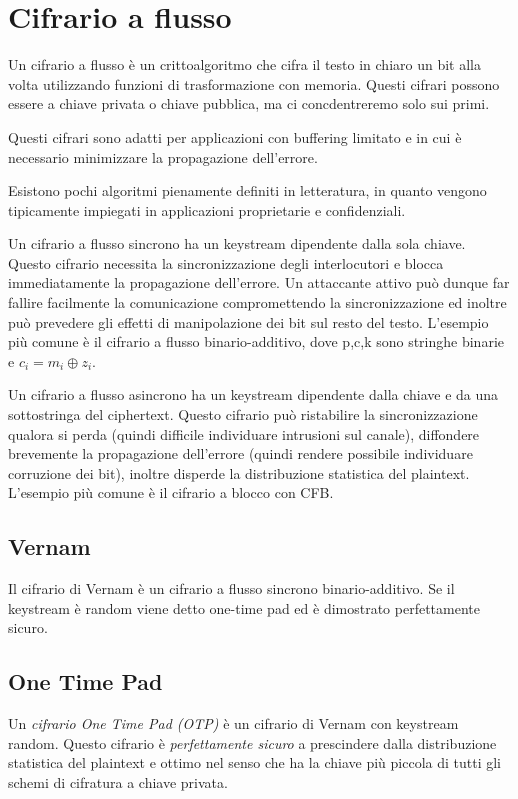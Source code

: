 \chapter{Cifrario a flusso}
\label{chp:stream-ciphers}

Un cifrario a flusso è un crittoalgoritmo che cifra il testo in chiaro un bit alla volta utilizzando funzioni di trasformazione con memoria.
Questi cifrari possono essere a chiave privata o chiave pubblica, ma ci concdentreremo solo sui primi.

Questi cifrari sono adatti per applicazioni con buffering limitato e in cui è necessario minimizzare la propagazione dell'errore.

Esistono pochi algoritmi pienamente definiti in letteratura, in quanto vengono tipicamente impiegati in applicazioni proprietarie e confidenziali.

Un cifrario a flusso sincrono ha un keystream dipendente dalla sola chiave. Questo cifrario necessita la sincronizzazione degli interlocutori e blocca immediatamente la propagazione dell'errore.
Un attaccante attivo può dunque far fallire facilmente la comunicazione compromettendo la sincronizzazione ed inoltre può prevedere gli effetti di manipolazione dei bit sul resto del testo.
L'esempio più comune è il cifrario a flusso binario-additivo, dove p,c,k sono stringhe binarie e $c_{i}=m_{i} \oplus z_{i}$.

Un cifrario a flusso asincrono ha un keystream dipendente dalla chiave e da una sottostringa del ciphertext.
Questo cifrario può ristabilire la sincronizzazione qualora si perda (quindi difficile individuare intrusioni sul canale), diffondere brevemente la propagazione dell'errore (quindi rendere possibile individuare corruzione dei bit), inoltre disperde la distribuzione statistica del plaintext. L'esempio più comune è il cifrario a blocco con CFB.

\section{Vernam}
Il cifrario di Vernam è un cifrario a flusso sincrono binario-additivo.
Se il keystream è random viene detto one-time pad ed è dimostrato perfettamente sicuro.

\section{One Time Pad}
Un \textit{cifrario One Time Pad (OTP)} è un cifrario di Vernam con keystream random.
Questo cifrario è \textit{perfettamente sicuro} a prescindere dalla distribuzione statistica del plaintext e ottimo nel senso che ha la chiave più piccola di tutti gli schemi di cifratura a chiave privata.

